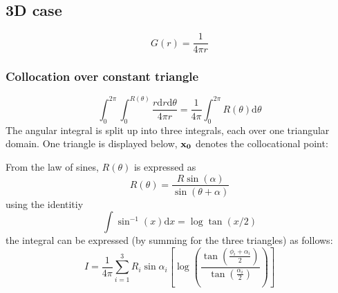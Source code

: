 \documentclass[a4paper,11pt]{article}
\newcommand{\td}{\mathrm{d}}
\begin{document}
\subsection{3D case}

\begin{equation}
G(r) = \frac{1}{4\pi r}
\end{equation}

\subsubsection{Collocation over constant triangle}

\begin{equation}
\int_0^{2\pi} \int_0^{R(\theta)} \frac{r \td r \td \theta}{4\pi r}
=
\frac{1}{4\pi}\int_0^{2\pi} R(\theta) \td \theta
\end{equation}
%
The angular integral is split up into three integrals, each over one triangular domain.
One triangle is displayed below, $\bf x_0$ denotes the collocational point:


From the law of sines, $R(\theta)$ is expressed as
%
\begin{equation}
R(\theta) = \frac{R \sin(\alpha)}{\sin(\theta+\alpha)}
\end{equation}
%
using the identitiy
%
\begin{equation}
\int \sin^{-1}(x) \td x = \log \tan (x/2)
\end{equation}
%
the integral can be expressed (by summing for the three triangles) as follows:
%
\begin{equation}
I = \frac{1}{4\pi} \sum_{i = 1}^3
R_i \sin\alpha_i \left[ \log \left( \frac{\tan\left(\frac{\phi_i+\alpha_i}{2}\right)}{\tan\left(\frac{\alpha_i}{2}\right)}\right)\right]
\end{equation}
\end{document}
